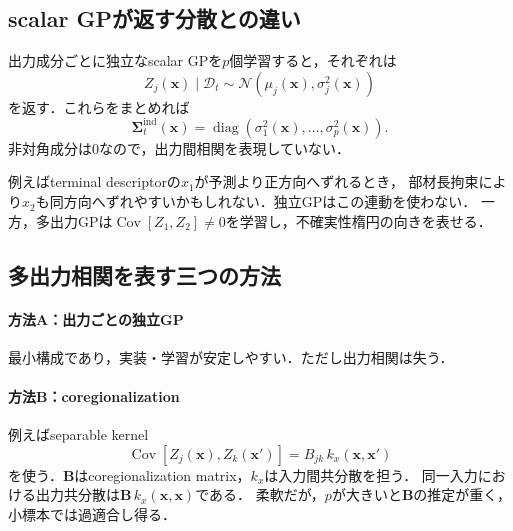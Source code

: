\documentclass[a4paper,11pt]{ltjsarticle}
\newcommand{\N}{\mathcal N}
\newcommand{\D}{\mathcal D}
\newcommand{\Cov}{\operatorname{Cov}}
\newcommand{\diag}{\operatorname{diag}}
\begin{document}
\subsection{scalar GPが返す分散との違い}

出力成分ごとに独立なscalar GPを\(p\)個学習すると，それぞれは
\begin{equation}
  Z_j(\bm x)\mid\D_t
  \sim\N(\mu_j(\bm x),\sigma_j^2(\bm x))
\end{equation}
を返す．これらをまとめれば
\begin{equation}
  \bm\Sigma_t^{\mathrm{ind}}(\bm x)
  =\diag(\sigma_1^2(\bm x),\ldots,\sigma_p^2(\bm x)).
  \label{eq:independent-output-covariance}
\end{equation}
非対角成分は0なので，出力間相関を表現していない．

例えばterminal descriptorの\(x_1\)が予測より正方向へずれるとき，
部材長拘束により\(x_2\)も同方向へずれやすいかもしれない．独立GPはこの連動を使わない．
一方，多出力GPは\(\Cov[Z_1,Z_2]\neq0\)を学習し，不確実性楕円の向きを表せる．

\subsection{多出力相関を表す三つの方法}

\paragraph{方法A：出力ごとの独立GP}
最小構成であり，実装・学習が安定しやすい．ただし出力相関は失う．

\paragraph{方法B：coregionalization}
例えばseparable kernel
\begin{equation}
  \Cov[Z_j(\bm x),Z_k(\bm x')]
  =B_{jk}\,k_x(\bm x,\bm x')
  \label{eq:separable-multioutput-kernel}
\end{equation}
を使う．\(\bm B\)はcoregionalization matrix，\(k_x\)は入力間共分散を担う．
同一入力における出力共分散は\(\bm B\,k_x(\bm x,\bm x)\)である．
柔軟だが，\(p\)が大きいと\(\bm B\)の推定が重く，小標本では過適合し得る．
\end{document}
